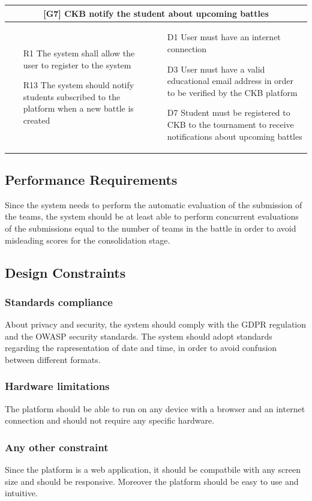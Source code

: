 \begin{tabular}{|p{6cm}|p{6cm}|}
    \hline
    \multicolumn{2}{|c|}{[G7] CKB notify the student about upcoming battles} \\
    \hline
    \begin{itemize}
        \item [R1] The system shall allow the user to register to the system
        \item [R13] The system should notify students subscribed to the platform when a new battle is created
    \end{itemize}
    &
    \begin{itemize}
        \item [D1] User must have an internet connection
        \item [D3] User must have a valid educational email address in order to be verified by the CKB platform
        \item [D7] Student must be registered to CKB to the tournament to receive notifications about upcoming battles
    \end{itemize}
    \\
    \hline
\end{tabular}

\subsection{Performance Requirements}
Since the system needs to perform the automatic evaluation of the submission of the teams, the system should be at least able to perform concurrent evaluations of the submissions equal to the number of teams in the battle in order to avoid misleading scores for the consolidation stage.

\subsection{Design Constraints}
\subsubsection{Standards compliance}
About privacy and security, the system should comply with the GDPR regulation and the OWASP security standards.
The system should adopt standards regarding the rapresentation of date and time, in order to avoid confusion between different formats.
\subsubsection{Hardware limitations}
The platform should be able to run on any device with a browser and an internet connection and should not require any specific hardware.
\subsubsection{Any other constraint}
Since the platform is a web application, it should be compatbile with any screen size and should be responsive. Moreover the platform should be easy to use and intuitive.